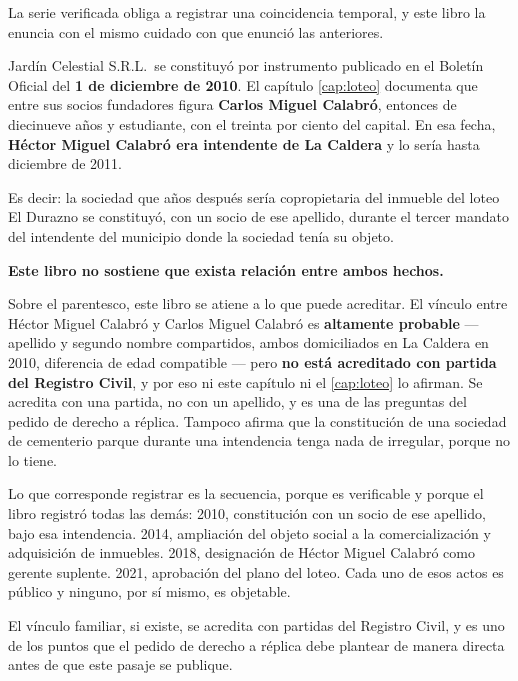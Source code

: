 \begin{cautela}
La serie verificada obliga a registrar una coincidencia temporal, y este libro la enuncia con el mismo cuidado con que enunció las anteriores.

Jardín Celestial S.R.L.\ se constituyó por instrumento publicado en el Boletín Oficial del \textbf{1 de diciembre de 2010}. El capítulo \ref{cap:loteo} documenta que entre sus socios fundadores figura \textbf{Carlos Miguel Calabró}, entonces de diecinueve años y estudiante, con el treinta por ciento del capital. En esa fecha, \textbf{Héctor Miguel Calabró era intendente de La Caldera} y lo sería hasta diciembre de 2011.

Es decir: la sociedad que años después sería copropietaria del inmueble del loteo El Durazno se constituyó, con un socio de ese apellido, durante el tercer mandato del intendente del municipio donde la sociedad tenía su objeto.

\textbf{Este libro no sostiene que exista relación entre ambos hechos.}

Sobre el parentesco, este libro se atiene a lo que puede acreditar. El vínculo entre Héctor Miguel Calabró y Carlos Miguel Calabró es \textbf{altamente probable} --- apellido y segundo nombre compartidos, ambos domiciliados en La Caldera en 2010, diferencia de edad compatible --- pero \textbf{no está acreditado con partida del Registro Civil}, y por eso ni este capítulo ni el \ref{cap:loteo} lo afirman. Se acredita con una partida, no con un apellido, y es una de las preguntas del pedido de derecho a réplica. Tampoco afirma que la constitución de una sociedad de cementerio parque durante una intendencia tenga nada de irregular, porque no lo tiene.

Lo que corresponde registrar es la secuencia, porque es verificable y porque el libro registró todas las demás: 2010, constitución con un socio de ese apellido, bajo esa intendencia. 2014, ampliación del objeto social a la comercialización y adquisición de inmuebles. 2018, designación de Héctor Miguel Calabró como gerente suplente. 2021, aprobación del plano del loteo. Cada uno de esos actos es público y ninguno, por sí mismo, es objetable.

El vínculo familiar, si existe, se acredita con partidas del Registro Civil, y es uno de los puntos que el pedido de derecho a réplica debe plantear de manera directa antes de que este pasaje se publique.
\end{cautela}

